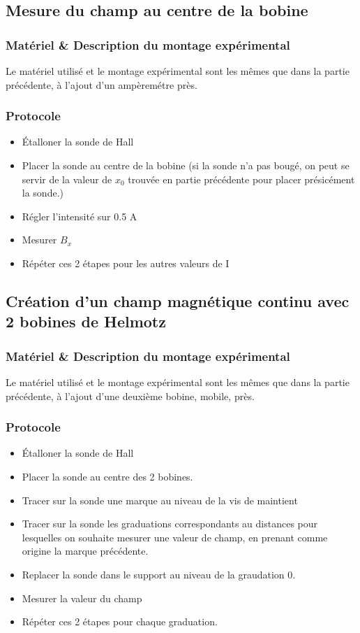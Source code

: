 \documentclass[a4paper,9pt,french]{scrartcl}
\begin{document}
\subsection{Mesure du champ au centre de la bobine}
\subsubsection{Matériel \& Description du montage expérimental}
Le matériel utilisé et le montage expérimental sont les m\^emes que dans la partie précédente, à l'ajout d'un ampèremétre près.
\subsubsection{Protocole}
\begin{itemize}
 \item Étalloner la sonde de Hall
 \item Placer la sonde au centre de la bobine (si la sonde n'a pas bougé, on peut se servir de la valeur de \(x_0\) trouvée en partie précédente pour placer présicément la sonde.)
 \item Régler l'intensité sur 0.5 A
 \item Mesurer \(B_x\)
 \item Répéter ces 2 étapes pour les autres valeurs de I
\end{itemize}
\subsection{Création d'un champ magnétique continu avec 2 bobines de Helmotz}
\subsubsection{Matériel \& Description du montage expérimental}
Le matériel utilisé et le montage expérimental sont les m\^emes que dans la partie précédente, à l'ajout d'une deuxième bobine, mobile, près.
\subsubsection{Protocole}
\begin{itemize}
 \item Étalloner la sonde de Hall
 \item Placer la sonde au centre des 2 bobines.
 \item Tracer sur la sonde une marque au niveau de la vis de maintient
 \item Tracer sur la sonde les graduations correspondants au distances pour lesquelles on souhaite mesurer une valeur de champ, en prenant comme origine la marque précédente.
 \item Replacer la sonde dans le support au niveau de la graudation 0.
 \item Mesurer la valeur du champ
 \item Répéter ces 2 étapes pour chaque graduation.
\end{itemize}
\end{document}
